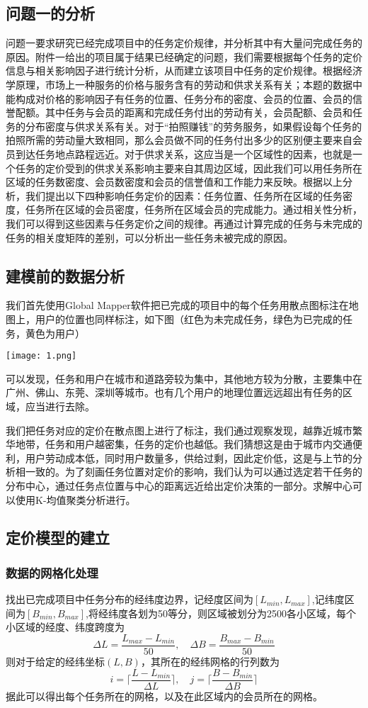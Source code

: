 \documentclass[withoutpreface,bwprint]{cumcmthesis} %
\begin{document}
\subsection{问题一的分析}
问题一要求研究已经完成项目中的任务定价规律，并分析其中有大量问完成任务的原因。附件一给出的项目属于结果已经确定的问题，我们需要根据每个任务的定价信息与相关影响因子进行统计分析，从而建立该项目中任务的定价规律。根据经济学原理，市场上一种服务的价格与服务含有的劳动和供求关系有关；本题的数据中能构成对价格的影响因子有任务的位置、任务分布的密度、会员的位置、会员的信誉配额。其中任务与会员的距离和完成任务付出的劳动有关，会员配额、会员和任务的分布密度与供求关系有关。对于“拍照赚钱”的劳务服务，如果假设每个任务的拍照所需的劳动量大致相同，那么会员做不同的任务付出多少的区别便主要来自会员到达任务地点路程远近。对于供求关系，这应当是一个区域性的因素，也就是一个任务的定价受到的供求关系影响主要来自其周边区域，因此我们可以用任务所在区域的任务数密度、会员数密度和会员的信誉值和工作能力来反映。根据以上分析，我们提出以下四种影响任务定价的因素：任务位置、任务所在区域的任务密度，任务所在区域的会员密度，任务所在区域会员的完成能力。通过相关性分析，我们可以得到这些因素与任务定价之间的规律。再通过计算完成的任务与未完成的任务的相关度矩阵的差别，可以分析出一些任务未被完成的原因。

\subsection{建模前的数据分析}
我们首先使用Global Mapper软件把已完成的项目中的每个任务用散点图标注在地图上，用户的位置也同样标注，如下图（红色为未完成任务，绿色为已完成的任务，黄色为用户）

\centerline{\texttt{[image: 1.png]}}
可以发现，任务和用户在城市和道路旁较为集中，其他地方较为分散，主要集中在广州、佛山、东莞、深圳等城市。也有几个用户的地理位置远远超出有任务的区域，应当进行去除。

我们把任务对应的定价在散点图上进行了标注，我们通过观察发现，越靠近城市繁华地带，任务和用户越密集，任务的定价也越低。我们猜想这是由于城市内交通便利，用户劳动成本低，同时用户数量多，供给过剩，因此定价低，这是与上节的分析相一致的。为了刻画任务位置对定价的影响，我们认为可以通过选定若干任务的分布中心，通过任务点位置与中心的距离远近给出定价决策的一部分。求解中心可以使用K-均值聚类分析进行。

\subsection{定价模型的建立}

\subsubsection{数据的网格化处理}
找出已完成项目中任务分布的经纬度边界，记经度区间为$[L_{min},L_{max}]$,记纬度区间为$[B_{min},B_{max}]$,将经纬度各划为50等分，则区域被划分为2500各小区域，每个小区域的经度、纬度跨度为$$\Delta L=\frac{L_{max}-L_{min}}{50},\quad \Delta B=\frac{B_{max}-B_{min}}{50}$$则对于给定的经纬坐标$(L,B)$，其所在的经纬网格的行列数为$$i=\lceil \frac{L-L_{min}}{\Delta L}\rceil,\quad j=\lceil \frac{B-B_{min}}{\Delta B}\rceil$$据此可以得出每个任务所在的网格，以及在此区域内的会员所在的网格。
\end{document}
